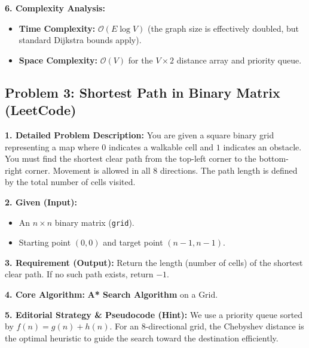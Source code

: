 \textbf{6. Complexity Analysis:}
\begin{itemize}
    \item \textbf{Time Complexity:} $\mathcal{O}(E \log V)$ (the graph size is effectively doubled, but standard Dijkstra bounds apply).
    \item \textbf{Space Complexity:} $\mathcal{O}(V)$ for the $V \times 2$ distance array and priority queue.
\end{itemize}

\subsection{Problem 3: Shortest Path in Binary Matrix (LeetCode)}

\textbf{1. Detailed Problem Description:}
You are given a square binary grid representing a map where $0$ indicates a walkable cell and $1$ indicates an obstacle. You must find the shortest clear path from the top-left corner to the bottom-right corner. Movement is allowed in all 8 directions. The path length is defined by the total number of cells visited.

\textbf{2. Given (Input):}
\begin{itemize}
    \item An $n \times n$ binary matrix (\texttt{grid}).
    \item Starting point $(0, 0)$ and target point $(n-1, n-1)$.
\end{itemize}

\textbf{3. Requirement (Output):}
Return the length (number of cells) of the shortest clear path. If no such path exists, return $-1$.

\textbf{4. Core Algorithm:} 
\textbf{A* Search Algorithm} on a Grid.

\textbf{5. Editorial Strategy \& Pseudocode (Hint):}
We use a priority queue sorted by $f(n) = g(n) + h(n)$. For an 8-directional grid, the Chebyshev distance is the optimal heuristic to guide the search toward the destination efficiently.

